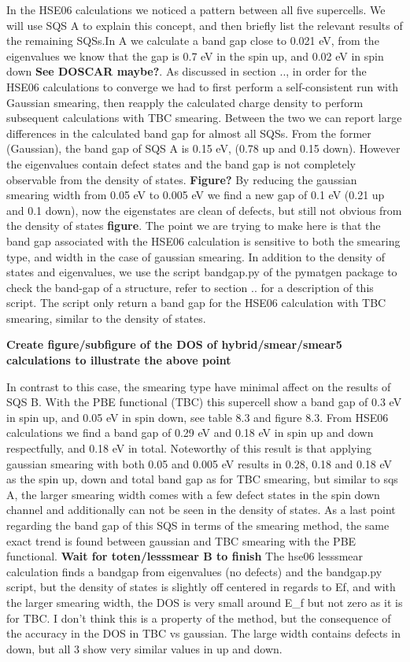 In the HSE06 calculations we noticed a pattern between all five supercells. We will use SQS A to explain this concept, and then briefly list the relevant results of the remaining SQSs.In A we calculate a band gap close to 0.021 eV, from the eigenvalues we know that the gap is 0.7 eV in the spin up, and 0.02 eV in spin down \textbf{See DOSCAR maybe?}. As discussed in section .., in order for the HSE06 calculations to converge we had to first perform a self-consistent run with Gaussian smearing, then reapply the calculated charge density to perform subsequent calculations with TBC smearing. Between the two we can report large differences in the calculated band gap for almost all SQSs. From the former (Gaussian), the band gap of SQS A is 0.15 eV, (0.78 up and 0.15 down). However the eigenvalues contain defect states and the band gap is not completely observable from the density of states. \textbf{Figure?} By reducing the gaussian smearing width from 0.05 eV to 0.005 eV we find a new gap of 0.1 eV (0.21 up and 0.1 down), now the eigenstates are clean of defects, but still not obvious from the density of states \textbf{figure}. The point we are trying to make here is that the band gap associated with the HSE06 calculation is sensitive to both the smearing type, and width in the case of gaussian smearing. In addition to the density of states and eigenvalues, we use the script bandgap.py of the pymatgen package to check the band-gap of a structure, refer to section .. for a description of this script. The script only return a band gap for the HSE06 calculation with TBC smearing, similar to the density of states. 

\textbf{Create figure/subfigure of the DOS of hybrid/smear/smear5 calculations to illustrate the above point}

In contrast to this case, the smearing type have minimal affect on the results of SQS B. With the PBE functional (TBC) this supercell show a band gap of 0.3 eV in spin up, and 0.05 eV in spin down, see table 8.3 and figure 8.3. From HSE06 calculations we find a band gap of 0.29 eV and 0.18 eV in spin up and down respectfully, and 0.18 eV in total. Noteworthy of this result is that applying gaussian smearing with both 0.05 and 0.005 eV results in 0.28, 0.18 and 0.18 eV as the spin up, down and total band gap as for TBC smearing, but similar to sqs A, the larger smearing width comes with a few defect states in the spin down channel and additionally can not be seen in the density of states. As a last point regarding the band gap of this SQS in terms of the smearing method, the same exact trend is found between gaussian and TBC smearing with the PBE functional. \textbf{Wait for toten/lesssmear B to finish}  The hse06 lesssmear calculation finds a bandgap from eigenvalues (no defects) and the bandgap.py script, but the density of states is slightly off centered in regards to Ef, and with the larger smearing width, the DOS is very small around E_f but not zero as it is for TBC. I don't think this is a property of the method, but the consequence of the accuracy in the DOS in TBC vs gaussian. The large width contains defects in down, but all 3 show very similar values in up and down.

